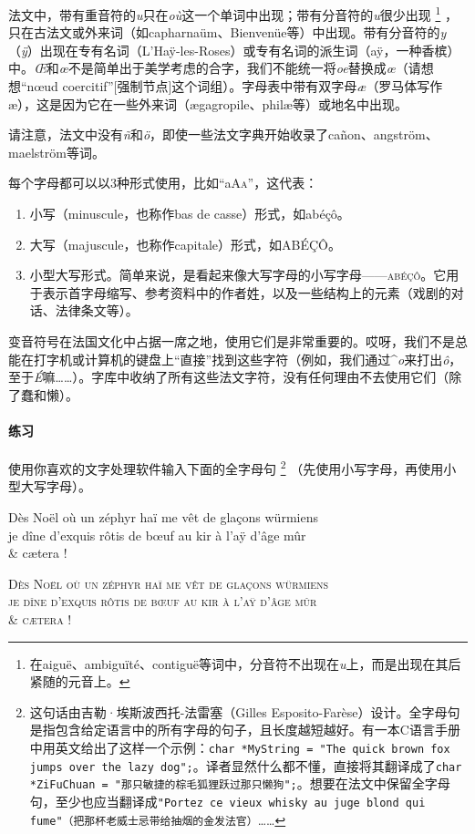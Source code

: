 法文中，带有重音符的\emph{u}只在\emph{où}这一个单词中出现；带有分音符的\emph{u}很少出现
    \footnote{在aiguë、ambiguïté、contiguë等词中，分音符不出现在\emph{u}上，而是出现在其后紧随的元音上。}
，只在古法文或外来词（如capharnaüm、Bienvenüe等）中出现。带有分音符的\emph{y}（\emph{ÿ}）出现在专有名词（L'Haÿ-les-Roses）或专有名词的派生词（aÿ，一种香槟）中。\emph{Œ}和\emph{œ}不是简单出于美学考虑的合字，我们不能统一将\emph{oe}替换成\emph{œ}（请想想``nœud coercitif''[强制节点]这个词组）。字母表中带有双字母\emph{æ}（罗马体写作æ），这是因为它在一些外来词（ægagropile、philæ等）或地名中出现。

请注意，法文中没有\emph{ñ}和\emph{ö}，即使一些法文字典开始收录了cañon、angström、maelström等词。

每个字母都可以以3种形式使用，比如``aA\textsc{a}''，这代表：

\begin{enumerate}
    \item 小写（minuscule，也称作bas de casse）形式，如abéçô。
    \item 大写（majuscule，也称作capitale）形式，如ABÉÇÔ。
    \item 小型大写形式。简单来说，是看起来像大写字母的小写字母——\textsc{abéçô}。它用于表示首字母缩写、参考资料中的作者姓，以及一些结构上的元素（戏剧的对话、法律条文等）。
\end{enumerate}

变音符号在法国文化中占据一席之地，使用它们是非常重要的。哎呀，我们不是总能在打字机或计算机的键盘上``直接''找到这些字符（例如，我们通过\^{}\emph{o}来打出\emph{ô}，至于\emph{É}嘛……）。字库中收纳了所有这些法文字符，没有任何理由不去使用它们（除了蠢和懒）。

\paragraph*{练习} 使用你喜欢的文字处理软件输入下面的全字母句
    \footnote{这句话由吉勒·埃斯波西托-法雷塞（Gilles Esposito-Farèse）设计。全字母句是指包含给定语言中的所有字母的句子，且长度越短越好。有一本C语言手册中用英文给出了这样一个示例：\texttt{char *MyString = "The quick brown fox jumps over the lazy dog";}。译者显然什么都不懂，直接将其翻译成了\texttt{char *ZiFuChuan = "那只敏捷的棕毛狐狸跃过那只懒狗";}。想要在法文中保留全字母句，至少也应当翻译成\texttt{"Portez ce vieux whisky au juge blond qui fume"（把那杯老威士忌带给抽烟的金发法官）}……
    }
（先使用小写字母，再使用小型大写字母）。

\begin{center}
    Dès Noël où un zéphyr haï me vêt de glaçons würmiens\\
    je dîne d'exquis rôtis de bœuf au kir à l'aÿ d'âge mûr\\
    \& cætera !

    \textsc{Dès Noël où un zéphyr haï me vêt de glaçons würmiens\\ je dîne d'exquis rôtis de bœuf au kir à l'aÿ d'âge mûr\\ \& cætera !}
\end{center}


